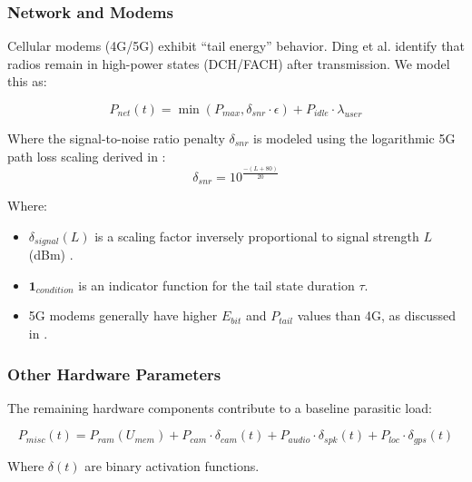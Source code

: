 \documentclass[12pt]{article}
\begin{document}
\subsubsection{Network and Modems}

Cellular modems (4G/5G) exhibit ``tail energy'' behavior. Ding et al. \cite{13} identify that radios remain in high-power states (DCH/FACH) after transmission. We model this as:

\begin{equation} \label{eq:network_power}
P_{net}(t) = \min \left( P_{max}, \delta_{snr} \cdot \epsilon \right) + P_{idle} \cdot \lambda_{user}
\end{equation}

Where the signal-to-noise ratio penalty $\delta_{snr}$ is modeled using the logarithmic 5G path loss scaling derived in \cite{13}:
\begin{equation} \label{eq:snr_penalty}
\delta_{snr} = 10^{\frac{-(L + 80)}{20}}
\end{equation}

Where:
\begin{itemize}
    \item $\delta_{signal}(L)$ is a scaling factor inversely proportional to signal strength $L$ (dBm) \cite{13}.
    \item $\mathbf{1}_{condition}$ is an indicator function for the tail state duration $\tau$.
    \item 5G modems generally have higher $E_{bit}$ and $P_{tail}$ values than 4G, as discussed in \cite{3}.
\end{itemize}


\subsubsection{Other Hardware Parameters}

The remaining hardware components contribute to a baseline parasitic load:

\begin{equation} \label{eq:misc_power}
P_{misc}(t) = P_{ram}(U_{mem}) + P_{cam} \cdot \delta_{cam}(t) + P_{audio} \cdot \delta_{spk}(t) + P_{loc} \cdot \delta_{gps}(t)
\end{equation}

Where $\delta(t)$ are binary activation functions.
\end{document}
